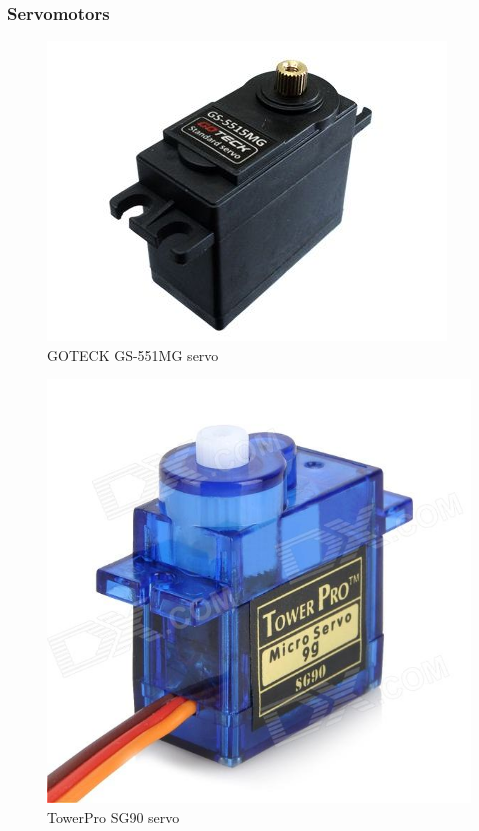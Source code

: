 	\subsubsection{Servomotors}

		\begin{figure}[H]
			\centering
			\includegraphics[scale=0.5]{images/ProjectComponents/servo1.jpg}
			\caption{GOTECK GS-551MG servo }
			\label{}
		\end{figure}
		\bigskip


		\begin{figure}[H]
			\centering
			\includegraphics[scale=0.25]{images/ProjectComponents/servo2.jpg}
			\caption{TowerPro SG90 servo }
			\label{}
		\end{figure}
		\bigskip






